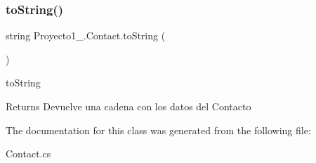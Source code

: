 \subsubsection{\texorpdfstring{to\+String()}{toString()}}
{\footnotesize\ttfamily string Proyecto1\+\_.\+Contact.\+to\+String (\begin{DoxyParamCaption}{ }\end{DoxyParamCaption})}



to\+String 

\begin{DoxyReturn}{Returns}
Devuelve una cadena con los datos del Contacto
\end{DoxyReturn}


The documentation for this class was generated from the following file\+:\begin{DoxyCompactItemize}
\item 
Contact.\+cs\end{DoxyCompactItemize}
